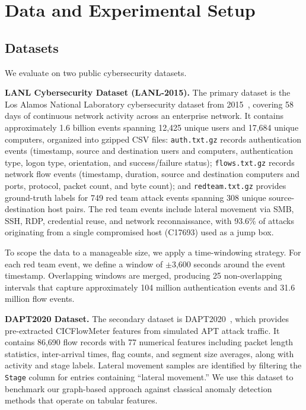 \section{Data and Experimental Setup}

\subsection{Datasets}

We evaluate on two public cybersecurity datasets.

\textbf{LANL Cybersecurity Dataset (LANL-2015).}
The primary dataset is the Los Alamos National Laboratory cybersecurity dataset from 2015~\cite{lanl2015}, covering 58 days of continuous network activity across an enterprise network. It contains approximately 1.6 billion events spanning 12,425 unique users and 17,684 unique computers, organized into gzipped CSV files: \texttt{auth.txt.gz} records authentication events (timestamp, source and destination users and computers, authentication type, logon type, orientation, and success/failure status); \texttt{flows.txt.gz} records network flow events (timestamp, duration, source and destination computers and ports, protocol, packet count, and byte count); and \texttt{redteam.txt.gz} provides ground-truth labels for 749 red team attack events spanning 308 unique source-destination host pairs. The red team events include lateral movement via SMB, SSH, RDP, credential reuse, and network reconnaissance, with 93.6\% of attacks originating from a single compromised host (C17693) used as a jump box.

To scope the data to a manageable size, we apply a time-windowing strategy. For each red team event, we define a window of $\pm$3,600 seconds around the event timestamp. Overlapping windows are merged, producing 25 non-overlapping intervals that capture approximately 104 million authentication events and 31.6 million flow events.

\textbf{DAPT2020 Dataset.}
The secondary dataset is DAPT2020~\cite{dapt2020}, which provides pre-extracted CICFlowMeter features from simulated APT attack traffic. It contains 86,690 flow records with 77 numerical features including packet length statistics, inter-arrival times, flag counts, and segment size averages, along with activity and stage labels. Lateral movement samples are identified by filtering the \texttt{Stage} column for entries containing ``lateral movement.'' We use this dataset to benchmark our graph-based approach against classical anomaly detection methods that operate on tabular features.

